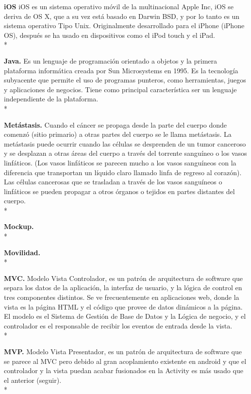 \documentclass[../pfc.tex]{subfiles}
\begin{document}
	\textbf{iOS}
	iOS es un sistema operativo móvil de la multinacional Apple Inc, iOS se deriva de OS X, que a su vez está basado en Darwin BSD, y por lo tanto es un sistema operativo Tipo Unix. Originalmente desarrollado para el iPhone (iPhone OS), después se ha usado en dispositivos como el iPod touch y el iPad. \\*
	
	\textbf{Java.}
	Es un lenguaje de programación orientado a objetos y la primera plataforma informática
	creada por Sun Microsystems en 1995. Es la tecnología subyacente que permite el uso de
	programas punteros, como herramientas, juegos y aplicaciones de negocios. Tiene como principal
	característica ser un lenguaje independiente de la plataforma.\\*
	
	\textbf{Metástasis.}
	Cuando el cáncer se propaga desde la parte del cuerpo donde comenzó (sitio primario) a otras partes del cuerpo se le llama metástasis. La metástasis puede ocurrir cuando las células se desprenden de un tumor canceroso y se desplazan a otras áreas del cuerpo a través del torrente sanguíneo o los vasos linfáticos. (Los vasos linfáticos se parecen mucho a los vasos sanguíneos con la diferencia que transportan un líquido claro llamado linfa de regreso al corazón). Las células cancerosas que se trasladan a través de los vasos sanguíneos o linfáticos se pueden propagar a otros órganos o tejidos en partes distantes del cuerpo.\cite{metastasis}\\*\
		
	\textbf{Mockup.}\\*
		
	\textbf{Movilidad.}\\*
	
	\textbf{MVC.}
	Modelo Vista Controlador, es un patrón de arquitectura de software que separa los datos de
	la aplicación, la interfaz de usuario, y la lógica de control en tres componentes distintos. Se ve
	frecuentemente en aplicaciones web, donde la vista es la página HTML y el código que provee de
	datos dinámicos a la página. El modelo es el Sistema de Gestión de Base de Datos y la Lógica de
	negocio, y el controlador es el responsable de recibir los eventos de entrada desde la vista.\\*
	
	\textbf{MVP.}
	Modelo Vista Presentador, es un patrón de arquitectura de software que se parece al MVC pero debido al gran acoplamiento existente en android y que el controlador y la vista puedan acabar fusionados en la Activity es más usado que el anterior (seguir).\\*
	
\end{document}
